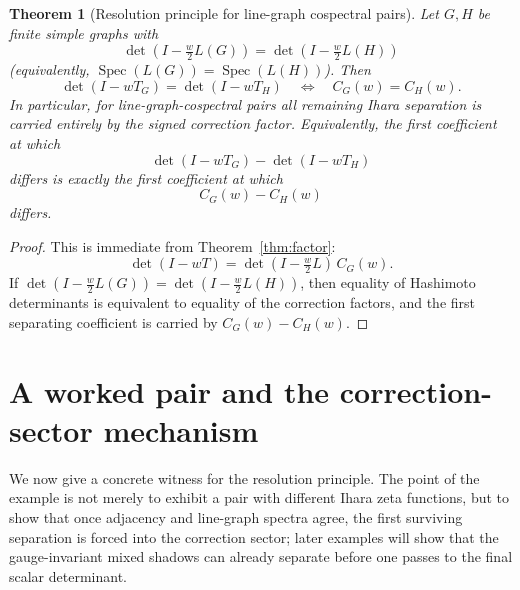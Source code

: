 \documentclass[11pt]{article}
\newtheorem{theorem}{Theorem}
\begin{document}
\begin{theorem}[Resolution principle for line-graph cospectral pairs]\label{thm:resolution}
Let $G,H$ be finite simple graphs with
\[
\det(I-\tfrac w2 L(G))=\det(I-\tfrac w2 L(H))
\]
(equivalently, $\operatorname{Spec}(L(G))=\operatorname{Spec}(L(H))$). Then
\[
\det(I-wT_G)=\det(I-wT_H)\quad\Longleftrightarrow\quad C_G(w)=C_H(w).
\]
In particular, for line-graph-cospectral pairs all remaining Ihara separation is carried entirely by the signed correction factor. Equivalently, the first coefficient at which
\[
\det(I-wT_G)-\det(I-wT_H)
\]
differs is exactly the first coefficient at which
\[
C_G(w)-C_H(w)
\]
differs.
\end{theorem}

\begin{proof}
This is immediate from Theorem~\ref{thm:factor}:
\[
\det(I-wT)=\det(I-\tfrac w2 L)\,C_G(w).
\]
If $\det(I-\tfrac w2 L(G))=\det(I-\tfrac w2 L(H))$, then equality of Hashimoto determinants is equivalent to equality of the correction factors, and the first separating coefficient is carried by $C_G(w)-C_H(w)$.
\end{proof}

\section{A worked pair and the correction-sector mechanism}

We now give a concrete witness for the resolution principle. The point of the example is not merely to exhibit a pair with different Ihara zeta functions, but to show that once adjacency and line-graph spectra agree, the first surviving separation is forced into the correction sector; later examples will show that the gauge-invariant mixed shadows can already separate before one passes to the final scalar determinant.
\end{document}

